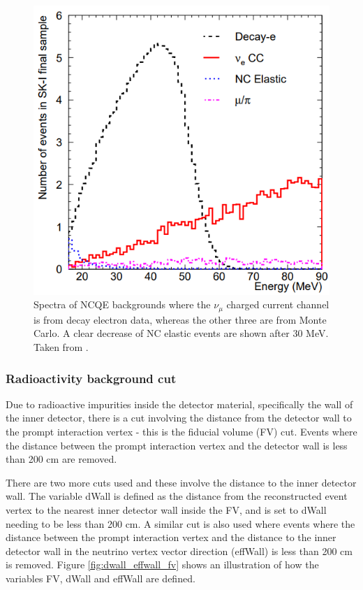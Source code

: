 \begin{figure}
\includegraphics[width=\textwidth]{Figures/michel_electron.png}
\caption{Spectra of NCQE backgrounds where the $\nu_{\mu}$ charged current channel is from decay electron data, whereas the other three are from Monte Carlo. A clear decrease of NC elastic events are shown after 30 MeV. Taken from \cite{michel_electron}. }
\label{fig:michel_electron}
\end{figure} 

\subsubsection{Radioactivity background cut}

Due to radioactive impurities inside the detector material, specifically the wall of the inner detector, there is a cut involving the distance from the detector wall to the prompt interaction vertex - this is the fiducial volume (FV) cut. Events where the distance between the prompt interaction vertex and the detector wall is less than 200 cm are removed.

There are two more cuts used and these involve the distance to the inner detector wall. The variable dWall is defined as the distance from the reconstructed event vertex to the nearest inner detector wall inside the FV, and is set to dWall needing to be less than 200 cm.  A similar cut is also used where events where the distance between the prompt interaction vertex and the distance to the inner detector wall in the neutrino vertex vector direction (effWall) is less than 200 cm is removed. Figure \ref{fig:dwall_effwall_fv} shows an illustration of how the variables FV, dWall and effWall are defined. 

